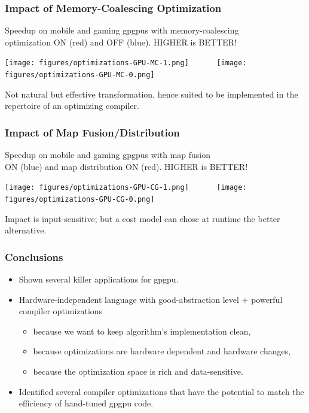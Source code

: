 \documentclass{beamer}
\newcommand{\emp}[1]{\textcolor{DikuRed}{ #1}}
\newcommand{\emphb}[1]{\textcolor{CosBlue}{ #1}}
\newcommand{\empr}[1]{\textcolor{CosRed}{ #1}}
\begin{document}
\begin{frame}[fragile,t]
  \frametitle{Impact of Memory-Coalescing Optimization}

Speedup on mobile and gaming {\sc gpgpu}s with memory-coalescing \\ 
optimization \empr{ON} (red) and \emphb{OFF} (blue). HIGHER is BETTER!
\smallskip
\begin{center} 
\texttt{[image: figures/optimizations-GPU-MC-1.png]} 
$\mbox{ }\mbox{ }\mbox{ }\mbox{ }$
\texttt{[image: figures/optimizations-GPU-MC-0.png]} 
\end{center} 
\smallskip

\emp{Not natural but effective transformation, hence suited to be implemented in the repertoire of an optimizing compiler.}

\end{frame}





\begin{frame}[fragile,t]
  \frametitle{Impact of Map Fusion/Distribution}

Speedup on mobile and gaming {\sc gpgpu}s with map fusion \\ 
\emphb{ON} (blue) and map distribution \empr{ON} (red). HIGHER is BETTER!
\smallskip
\begin{center} 
\texttt{[image: figures/optimizations-GPU-CG-1.png]} 
$\mbox{ }\mbox{ }\mbox{ }\mbox{ }$
\texttt{[image: figures/optimizations-GPU-CG-0.png]} 
\end{center} 
\smallskip

Impact is input-sensitive; but a cost model can chose at runtime the better alternative.

\end{frame}


\begin{frame}
  \frametitle{Conclusions}

\begin{itemize}
    \item Shown several killer applications for {\sc gpgpu}. \bigskip
    \item Hardware-independent language with good-abstraction level + powerful compiler optimizations \smallskip  %
        \begin{itemize}
            \item because we want to keep algorithm's implementation clean, \smallskip
            \item because optimizations are hardware dependent and hardware changes, \smallskip
            \item because the optimization space is rich and data-sensitive. \bigskip
        \end{itemize}
    \item Identified several compiler optimizations that have the potential to match 
            the efficiency of hand-tuned {\sc gpgpu} code.  
\end{itemize}
\end{frame}

\end{document}
